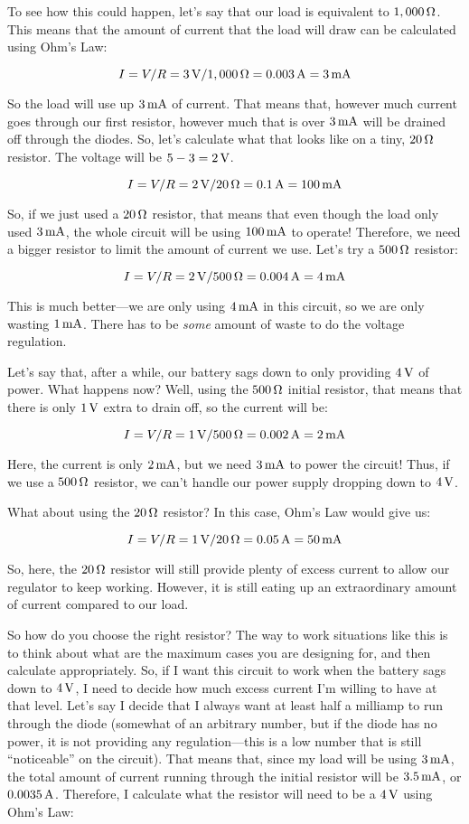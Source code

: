 To see how this could happen, let's say that our load is equivalent to $1,000\,\si{\ohm}$.
This means that the amount of current that the load will draw can be calculated using Ohm's Law:

$$ I = V / R = 3\,\si{\volt} / 1,000\,\si{\ohm} = 0.003\,\si{\ampere} = 3\,\si{\milli\ampere} $$

So the load will use up $3\,\si{\milli\ampere}$ of current.
That means that, however much current goes through our first resistor, however much that is over $3\,\si{\milli\ampere}$ will be drained off through the diodes.
So, let's calculate what that looks like on a tiny, $20\,\si{\ohm}$ resistor.
The voltage will be $5 - 3 = 2\,\si{\volt}$.

$$ I = V / R = 2\,\si{\volt} / 20\,\si{\ohm} = 0.1\,\si{\ampere} = 100\,\si{\milli\ampere} $$

So, if we just used a $20\,\si{\ohm}$ resistor, that means that even though the load only used $3\,\si{\milli\ampere}$, the whole circuit will be using $100\,\si{\milli\ampere}$ to operate!
Therefore, we need a bigger resistor to limit the amount of current we use.
Let's try a $500\,\si{\ohm}$ resistor:

$$ I = V / R = 2\,\si{\volt} / 500\,\si{\ohm} = 0.004\,\si{\ampere} = 4\,\si{\milli\ampere} $$

This is much better---we are only using $4\,\si{\milli\ampere}$ in this circuit, so we are only wasting $1\,\si{\milli\ampere}$.
There has to be \emph{some} amount of waste to do the voltage regulation.

Let's say that, after a while, our battery sags down to only providing $4\,\si{\volt}$ of power.
What happens now?
Well, using the $500\,\si{\ohm}$ initial resistor, that means that there is only $1\,\si{\volt}$ extra to drain off, so the current will be:

$$ I = V / R = 1\,\si{\volt} / 500\,\si{\ohm} = 0.002\,\si{\ampere} = 2\,\si{\milli\ampere} $$

Here, the current is only $2\,\si{\milli\ampere}$, but we need $3\,\si{\milli\ampere}$ to power the circuit!
Thus, if we use a $500\,\si{\ohm}$ resistor, we can't handle our power supply dropping down to $4\,\si{\volt}$.

What about using the $20\,\si{\ohm}$ resistor?
In this case, Ohm's Law would give us:

$$ I = V / R = 1\,\si{\volt} / 20\,\si{\ohm} = 0.05\,\si{\ampere} = 50\,\si{\milli\ampere} $$

So, here, the $20\,\si{\ohm}$ resistor will still provide plenty of excess current to allow our regulator to keep working.
However, it is still eating up an extraordinary amount of current compared to our load.

So how do you choose the right resistor?
The way to work situations like this is to think about what are the maximum cases you are designing for, and then calculate appropriately.
So, if I want this circuit to work when the battery sags down to $4\,\si{\volt}$, I need to decide how much excess current I'm willing to have at that level.
Let's say I decide that I always want at least half a milliamp to run through the diode (somewhat of an arbitrary number, but if the diode has no power, it is not providing any regulation---this is a low number that is still ``noticeable'' on the circuit).
That means that, since my load will be using $3\,\si{\milli\ampere}$, the total amount of current running through the initial resistor will be $3.5\,\si{\milli\ampere}$, or $0.0035\,\si{\ampere}$.
Therefore, I calculate what the resistor will need to be a $4\,\si{\volt}$ using Ohm's Law:

